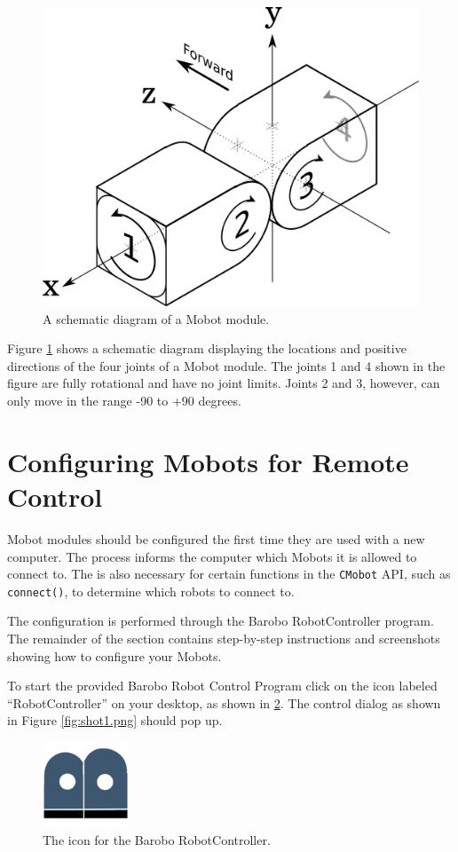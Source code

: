 \documentclass{article}
\begin{document}
\begin{figure}[H]
\begin{center}
\includegraphics[width=4.5in]{images/joint_diagram_verbose.png}
\end{center}
\caption{\label{fig:joint_diagram_verbose.png} A schematic diagram of a Mobot module.}
\end{figure}

Figure \ref{fig:joint_diagram_verbose.png} shows a schematic diagram displaying the
locations and positive directions of the four joints of a Mobot module. The
joints 1 and 4 shown in the figure are fully rotational and have no joint limits.
Joints 2 and 3, however, can only move in the range -90 to +90 degrees.


\section{\label{sec:pairing}Configuring Mobots for Remote Control}
Mobot modules should be configured the first time they are used with 
a new computer. The process informs the computer which Mobots it
is allowed to connect to. The is also necessary for certain 
functions in the \texttt{CMobot} API, such as \texttt{connect()},
to determine which robots to connect to.

The configuration is performed through the Barobo RobotController
program. The remainder of the section contains step-by-step instructions
and screenshots showing how to configure your Mobots.

To start the provided Barobo Robot Control Program click on the icon labeled 
``RobotController'' on your desktop, as shown in \ref{fig:barobo_icon.png}. The 
control dialog as shown in Figure \ref{fig:shot1.png} should pop up.
\begin{figure}[H]
\begin{center}
\includegraphics[width=1in]{images/barobo_icon.png}
\end{center}
\caption{\label{fig:barobo_icon.png} The icon for the Barobo RobotController.}
\end{figure}
\end{document}
